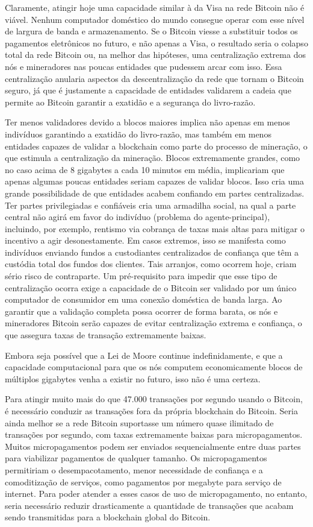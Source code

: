 \documentclass[letterpaper,11pt]{article}
\begin{document}
Claramente, atingir hoje uma capacidade similar à da Visa na rede Bitcoin não é
viável. Nenhum computador doméstico do mundo consegue operar com esse nível de
largura de banda e armazenamento. Se o Bitcoin viesse a substituir todos os
pagamentos eletrônicos no futuro, e não apenas a Visa, o resultado seria o
colapso total da rede Bitcoin ou, na melhor das hipóteses, uma centralização
extrema dos nós e mineradores nas poucas entidades que pudessem arcar com isso.
Essa centralização anularia aspectos da descentralização da rede que tornam o
Bitcoin seguro, já que é justamente a capacidade de entidades validarem a cadeia
que permite ao Bitcoin garantir a exatidão e a segurança do livro-razão.

Ter menos validadores devido a blocos maiores implica não apenas em menos
indivíduos garantindo a exatidão do livro-razão, mas também em menos entidades
capazes de validar a blockchain como parte do processo de mineração, o que
estimula a centralização da mineração. Blocos extremamente grandes, como no caso
acima de 8 gigabytes a cada 10 minutos em média, implicariam que apenas algumas
poucas entidades seriam capazes de validar blocos. Isso cria uma grande
possibilidade de que entidades acabem confiando em partes centralizadas. Ter
partes privilegiadas e confiáveis cria uma armadilha social, na qual a parte
central não agirá em favor do indivíduo (problema do agente-principal),
incluindo, por exemplo, rentismo via cobrança de taxas mais altas para mitigar o
incentivo a agir desonestamente. Em casos extremos, isso se manifesta como
indivíduos enviando fundos a custodiantes centralizados de confiança que têm a
custódia total dos fundos dos clientes. Tais arranjos, como ocorrem hoje, criam
sério risco de contraparte. Um pré-requisito para impedir que esse tipo de
centralização ocorra exige a capacidade de o Bitcoin ser validado por um único
computador de consumidor em uma conexão doméstica de banda larga. Ao garantir
que a validação completa possa ocorrer de forma barata, os nós e mineradores
Bitcoin serão capazes de evitar centralização extrema e confiança, o que assegura
taxas de transação extremamente baixas.

Embora seja possível que a Lei de Moore continue indefinidamente, e que a
capacidade computacional para que os nós computem economicamente blocos de
múltiplos gigabytes venha a existir no futuro, isso não é uma certeza.

Para atingir muito mais do que 47.000 transações por segundo usando o Bitcoin,
é necessário conduzir as transações fora da própria blockchain do Bitcoin. Seria
ainda melhor se a rede Bitcoin suportasse um número quase ilimitado de
transações por segundo, com taxas extremamente baixas para micropagamentos.
Muitos micropagamentos podem ser enviados sequencialmente entre duas partes para
viabilizar pagamentos de qualquer tamanho. Os micropagamentos permitiriam o
desempacotamento, menor necessidade de confiança e a comoditização de serviços,
como pagamentos por megabyte para serviço de internet. Para poder atender a
esses casos de uso de micropagamento, no entanto, seria necessário reduzir
drasticamente a quantidade de transações que acabam sendo transmitidas para a
blockchain global do Bitcoin.
\end{document}
